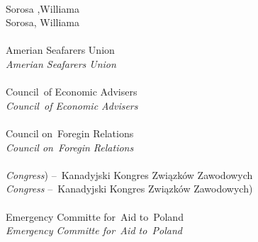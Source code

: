 \documentclass[a4paper,11pt]{article}
\begin{document}
\begin{center}
\begin{tabular}{|c|c|c|c|c|}
    \hline
  \end{tabular}
\end{center}
\noi
{} \\
\Jest Sorosa ,Williama \\
\Pow Sorosa, Williama \\
 \\
\Jest Amerian Seafarers Union \\
\Pow  \emph{Amerian Seafarers Union} \\
 \\
\Jest Council~of Economic Advisers \\
\Pow  \emph{Council~of Economic Advisers} \\
 \\
\Jest Council on~Foregin Relations \\
\Pow  \emph{Council on~Foregin Relations} \\
 \\
\Jest \emph{Congress}) --~Kanadyjski Kongres Związków Zawodowych \\
\Pow  \emph{Congress} --~Kanadyjski Kongres Związków Zawodowych) \\
 \\
\Jest Emergency Committe for~Aid to~Poland \\
\Pow  \emph{Emergency Committe for~Aid to~Poland} \\
\end{document}
